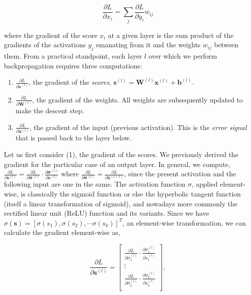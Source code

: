 \documentclass[11pt]{amsart}
\begin{document}
$$\frac{\partial L}{\partial x_i} = \sum_j \frac{\partial L}{\partial y_i} w_{ij}$$

where the gradient of the score $x_i$ at a given layer is the sum product of the gradients of the activations $y_j$ emanating from it and the weights $w_{ij}$ between them. From a practical standpoint, each layer $l$ over which we perform backpropagation requires three computations:

\begin{enumerate}
\item $\frac{\partial L}{\partial \mathbf{s}^{(l)}}$, the gradient of the \emph{scores}, $\mathbf{s}^{(l)} = \mathbf{W}^{(l)}\mathbf{x}^{(l)} + \mathbf{b}^{(l)}$.
\item $\frac{\partial L}{\partial \mathbf{W}^{(l)}}$, the gradient of the weights. All weights are subsequently updated to make the descent step.
\item $\frac{\partial L}{\partial \mathbf{x}^{(l)}}$, the gradient of the input (previous activation). This is the \emph{error signal} that is passed back to the layer below.
\end{enumerate}

Let us first consider (1), the gradient of the scores. We previously derived the gradient for the particular case of an output layer. In general, we compute, $\frac{\partial L}{\partial \mathbf{s}^{(l)}} = \frac{\partial L}{\partial \boldsymbol\sigma^{(l)}}\cdot\frac{\partial\boldsymbol\sigma^{(l)}}{\partial\mathbf{s}^{(l)}}$ where $\frac{\partial L}{\partial \boldsymbol\sigma^{(l)}} = \frac{\partial L}{\partial \mathbf{x}^{(l+1)}}$, since the present activation and the following input are one in the same. The activation function $\sigma$, applied element-wise, is classically the sigmoid function or else the hyperbolic tangent function (itself a linear transformation of sigmoid), and nowadays more commonly the rectified linear unit (ReLU) function and its variants. Since we have $\sigma(\mathbf{s}) = [\sigma(s_1), \sigma(s_2), \cdots \sigma(s_k)]^T$, an element-wise transformation, we can calculate the gradient element-wise as,

$$
\frac{\partial L}{\partial \mathbf{s}^{(l)}} =
\begin{bmatrix}
\frac{\partial L}{\partial\sigma_1^{(l)}}\cdot\frac{\partial\sigma_1^{(l)}}{\partial{s}_1^{(l)}} \\ 
\vdots \\
\frac{\partial L}{\partial\sigma_k^{(l)}}\cdot\frac{\partial\sigma_k^{(l)}}{\partial{s}_k^{(l)}} \\
\end{bmatrix},
$$
\end{document}
